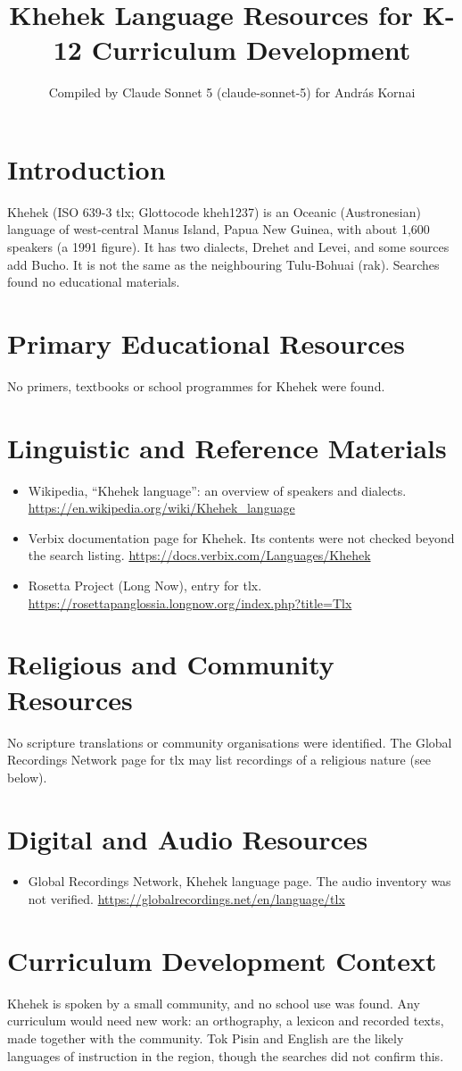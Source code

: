 \documentclass[12pt]{article}
\title{Khehek Language Resources for K-12 Curriculum Development}
\author{Compiled by Claude Sonnet 5 (claude-sonnet-5) for Andr\'as Kornai}
\date{}
\begin{document}
\maketitle

\section{Introduction}
Khehek (ISO 639-3 tlx; Glottocode kheh1237) is an Oceanic (Austronesian) language of west-central Manus Island, Papua New Guinea, with about 1,600 speakers (a 1991 figure). It has two dialects, Drehet and Levei, and some sources add Bucho. It is not the same as the neighbouring Tulu-Bohuai (rak). Searches found no educational materials.

\section{Primary Educational Resources}
No primers, textbooks or school programmes for Khehek were found.

\section{Linguistic and Reference Materials}
\begin{itemize}
\item Wikipedia, ``Khehek language'': an overview of speakers and dialects. \url{https://en.wikipedia.org/wiki/Khehek_language}
\item Verbix documentation page for Khehek. Its contents were not checked beyond the search listing. \url{https://docs.verbix.com/Languages/Khehek}
\item Rosetta Project (Long Now), entry for tlx. \url{https://rosettapanglossia.longnow.org/index.php?title=Tlx}
\end{itemize}

\section{Religious and Community Resources}
No scripture translations or community organisations were identified. The Global Recordings Network page for tlx may list recordings of a religious nature (see below).

\section{Digital and Audio Resources}
\begin{itemize}
\item Global Recordings Network, Khehek language page. The audio inventory was not verified. \url{https://globalrecordings.net/en/language/tlx}
\end{itemize}

\section{Curriculum Development Context}
Khehek is spoken by a small community, and no school use was found. Any curriculum would need new work: an orthography, a lexicon and recorded texts, made together with the community. Tok Pisin and English are the likely languages of instruction in the region, though the searches did not confirm this.
\end{document}
